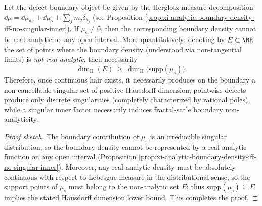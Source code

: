 \begin{proposition}\label{con:discussion-singular-hair-hausdorff-lower-bound}
Let the defect boundary object be given by the Herglotz measure decomposition
\(
\dd\mu=\dd\mu_{\mathrm{ac}}+\dd\mu_{\mathrm{s}}+\sum_j m_j\delta_{\theta_j}
\)
(see Proposition \ref{prop:xi-analytic-boundary-density-iff-no-singular-inner}).
If \(\mu_{\mathrm{s}}\neq 0\), then the corresponding boundary density cannot be real analytic on any open interval.
More quantitatively: denoting by \(E\subset\RR\) the set of points where the boundary density (understood via non-tangential limits) is \emph{not real analytic}, then necessarily
\[
\boxed{\;
\dim_{\mathrm{H}}(E)\ \ge\ \dim_{\mathrm{H}}\bigl(\mathrm{supp}(\mu_{\mathrm{s}})\bigr).\;}
\]
Therefore, once continuous hair exists, it necessarily produces on the boundary a non-cancellable singular set of positive Hausdorff dimension; pointwise defects produce only discrete singularities (completely characterized by rational poles), while a singular inner factor necessarily induces fractal-scale boundary non-analyticity.
\end{proposition}
\begin{proof}[Proof sketch]
The boundary contribution of \(\mu_{\mathrm{s}}\) is an irreducible singular distribution, so the boundary density cannot be represented by a real analytic function on any open interval (Proposition \ref{prop:xi-analytic-boundary-density-iff-no-singular-inner}).
Moreover, any real analytic density must be absolutely continuous with respect to Lebesgue measure in the distributional sense, so the support points of \(\mu_{\mathrm{s}}\) must belong to the non-analytic set \(E\); thus \(\mathrm{supp}(\mu_{\mathrm{s}})\subseteq E\) implies the stated Hausdorff dimension lower bound. This completes the proof.
\end{proof}

\par

